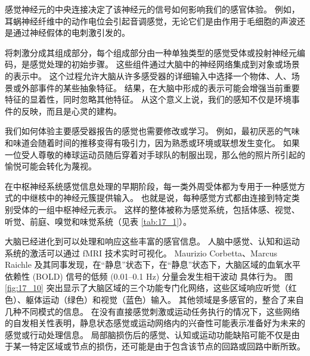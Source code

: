 感觉神经元的中央连接决定了该神经元的信号如何影响我们的感官体验。 
例如，耳蜗神经纤维中的动作电位会引起音调感觉，无论它们是由作用于毛细胞的声波还是通过神经假体的电刺激引发的。


将刺激分成其组成部分，每个组成部分由一种单独类型的感觉受体或投射神经元编码，是感觉处理的初始步骤。 
这些组件通过大脑中的神经网络集成到对象或场景的表示中。 
这个过程允许大脑从许多感受器的详细输入中选择一个物体、人、场景或外部事件的某些抽象特征。 
结果，在大脑中形成的表示可能会增强当前重要特征的显着性，同时忽略其他特征。 
从这个意义上说，我们的感知不仅是环境事件的反映，而且是心灵的建构。


我们如何体验主要感受器报告的感觉也需要修改或学习。 
例如，最初厌恶的气味和味道会随着时间的推移变得有吸引力，因为熟悉或环境或联想发生变化。 
如果一位受人尊敬的棒球运动员随后穿着对手球队的制服出现，那么他的照片所引起的愉悦可能会转化为蔑视。


在中枢神经系统感觉信息处理的早期阶段，每一类外周受体都为专用于一种感觉方式的中继核中的神经元簇提供输入。 
也就是说，每种感觉方式都由连接到特定类别受体的一组中枢神经元表示。 
这样的整体被称为感觉系统，包括体感、视觉、听觉、前庭、嗅觉和味觉系统（见表 \ref{tab:17_1}）。


大脑已经进化到可以处理和响应这些丰富的感官信息。 
人脑中感觉、认知和运动系统的激活可以通过 fMRI 技术实时可视化。 
Maurizio Corbetta、Marcus Raichle 及其同事发现，在“静息”状态下，在“静息”状态下，大脑区域的血氧水平依赖性 (BOLD) 信号的低频 (0.01–0.1 Hz) 分量会发生相干波动 具体行为。 
图 \ref{fig:17_10} 突出显示了大脑区域的三个功能专门化网络，这些区域响应听觉（红色）、躯体运动（绿色）和视觉（蓝色）输入。 
其他领域是多感官的，整合了来自几种不同模式的信息。 
在没有直接感觉刺激或运动任务执行的情况下，这些网络的自发相关性表明，静息状态感觉或运动网络内的兴奋性可能表示准备好为未来的感觉或行动处理信息。 
局部脑损伤后的感觉、认知或运动功能缺陷可能不仅是由于某一特定区域或节点的损伤，还可能是由于包含该节点的回路或回路中断所致。


